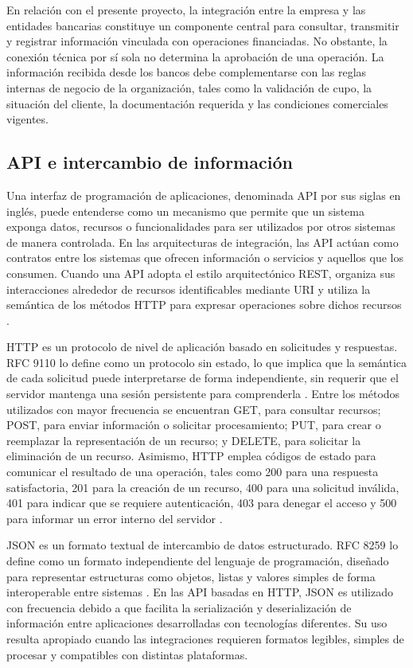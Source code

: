 En relación con el presente proyecto, la integración entre la empresa y las entidades bancarias constituye un componente central para consultar, transmitir y registrar información vinculada con operaciones financiadas. No obstante, la conexión técnica por sí sola no determina la aprobación de una operación. La información recibida desde los bancos debe complementarse con las reglas internas de negocio de la organización, tales como la validación de cupo, la situación del cliente, la documentación requerida y las condiciones comerciales vigentes.

\subsection{API e intercambio de información}

Una interfaz de programación de aplicaciones, denominada API por sus siglas en inglés, puede entenderse como un mecanismo que permite que un sistema exponga datos, recursos o funcionalidades para ser utilizados por otros sistemas de manera controlada. En las arquitecturas de integración, las API actúan como contratos entre los sistemas que ofrecen información o servicios y aquellos que los consumen. Cuando una API adopta el estilo arquitectónico REST, organiza sus interacciones alrededor de recursos identificables mediante URI y utiliza la semántica de los métodos HTTP para expresar operaciones sobre dichos recursos \citep{fielding2000,fielding2022}.

HTTP es un protocolo de nivel de aplicación basado en solicitudes y respuestas. RFC 9110 lo define como un protocolo sin estado, lo que implica que la semántica de cada solicitud puede interpretarse de forma independiente, sin requerir que el servidor mantenga una sesión persistente para comprenderla \citep{fielding2022}. Entre los métodos utilizados con mayor frecuencia se encuentran GET, para consultar recursos; POST, para enviar información o solicitar procesamiento; PUT, para crear o reemplazar la representación de un recurso; y DELETE, para solicitar la eliminación de un recurso. Asimismo, HTTP emplea códigos de estado para comunicar el resultado de una operación, tales como 200 para una respuesta satisfactoria, 201 para la creación de un recurso, 400 para una solicitud inválida, 401 para indicar que se requiere autenticación, 403 para denegar el acceso y 500 para informar un error interno del servidor \citep{fielding2022}.

JSON es un formato textual de intercambio de datos estructurado. RFC 8259 lo define como un formato independiente del lenguaje de programación, diseñado para representar estructuras como objetos, listas y valores simples de forma interoperable entre sistemas \citep{bray2017}. En las API basadas en HTTP, JSON es utilizado con frecuencia debido a que facilita la serialización y deserialización de información entre aplicaciones desarrolladas con tecnologías diferentes. Su uso resulta apropiado cuando las integraciones requieren formatos legibles, simples de procesar y compatibles con distintas plataformas.

